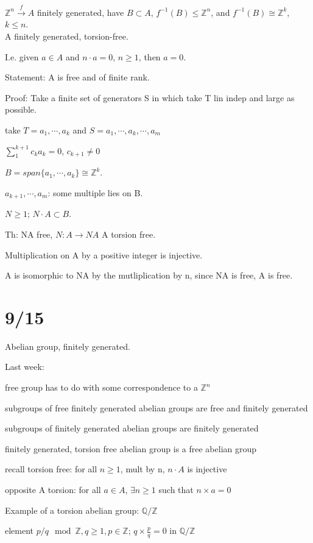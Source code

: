 \documentclass[12pt]{article}
\begin{document}
$\mathds{Z}^n \xrightarrow{f} A$ finitely generated, have $B \subset A$, $f^{-1}(B) \leq \mathds{Z}^n$, and $f^{-1}(B) \cong \mathds{Z}^k$, $k \leq n$.\\

\noindent
A finitely generated, torsion-free.

I.e. given $a \in A$ and $n \cdot a = 0$, $n \geq 1$, then $a = 0$.

Statement: A is free and of finite rank.

\noindent
Proof: Take a finite set of generators S in which take T lin indep and large as possible.

take $T = a_1, \cdots, a_k$ and $S = a_1, \cdots, a_k, \cdots, a_m$

$\sum_{1}^{k + 1} c_ka_k = 0$, $c_{k+1} \neq 0$

$B = span\{a_1, \cdots, a_k\} \cong \mathds{Z}^k$.

$a_{k + 1}, \cdots,a_m$: some multiple lies on B.

$N \geq 1$; $N \cdot A \subset B$.

Th: NA free, $N: A \to NA$ A torsion free.

Multiplication on A by a positive integer is injective.

A is isomorphic to NA by the mutliplication by n, since NA is free, A is free.

\section{9/15}

Abelian group, finitely generated.

\noindent
Last week:

free group has to do with some correspondence to a $\mathds{Z}^n$

subgroups of free finitely generated abelian groups are free and finitely generated

subgroups of finitely generated abelian groups are finitely generated

finitely generated, torsion free abelian group is a free abelian group

recall torsion free: for all $n \geq 1$, mult by n, $n \cdot A$ is injective

opposite A torsion: for all $a \in A$, $\exists n \geq 1$ such that $n \times a = 0$

\noindent
Example of a torsion abelian group: $\mathds{Q}/\mathds{Z}$

element $p/q \mod{\mathds{Z}}, q \geq 1, p \in \mathds{Z}$; $q \times \frac{p}{q} = 0$ in $\mathds{Q}/\mathds{Z}$
\end{document}
